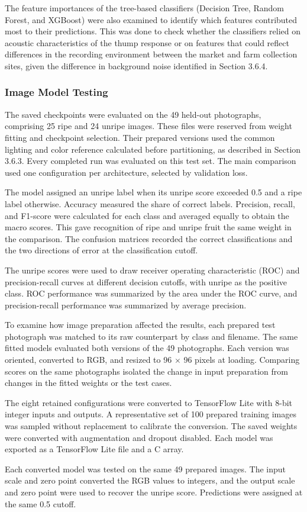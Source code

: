 \begin{thesisprose}
The feature importances of the tree-based classifiers (Decision Tree, Random Forest, and XGBoost) were also examined to identify which features contributed most to their predictions. This was done to check whether the classifiers relied on acoustic characteristics of the thump response or on features that could reflect differences in the recording environment between the market and farm collection sites, given the difference in background noise identified in Section 3.6.4.

\subsubsection*{Image Model Testing}

The saved checkpoints were evaluated on the 49 held-out photographs, comprising 25 ripe and 24 unripe images. These files were reserved from weight fitting and checkpoint selection. Their prepared versions used the common lighting and color reference calculated before partitioning, as described in Section 3.6.3. Every completed run was evaluated on this test set. The main comparison used one configuration per architecture, selected by validation loss.

The model assigned an unripe label when its unripe score exceeded 0.5 and a ripe label otherwise. Accuracy measured the share of correct labels. Precision, recall, and F1-score were calculated for each class and averaged equally to obtain the macro scores. This gave recognition of ripe and unripe fruit the same weight in the comparison. The confusion matrices recorded the correct classifications and the two directions of error at the classification cutoff.

The unripe scores were used to draw receiver operating characteristic (ROC) and precision-recall curves at different decision cutoffs, with unripe as the positive class. ROC performance was summarized by the area under the ROC curve, and precision-recall performance was summarized by average precision.

To examine how image preparation affected the results, each prepared test photograph was matched to its raw counterpart by class and filename. The same fitted models evaluated both versions of the 49 photographs. Each version was oriented, converted to RGB, and resized to 96 \ensuremath{\times} 96 pixels at loading. Comparing scores on the same photographs isolated the change in input preparation from changes in the fitted weights or the test cases.

The eight retained configurations were converted to TensorFlow Lite with 8-bit integer inputs and outputs. A representative set of 100 prepared training images was sampled without replacement to calibrate the conversion. The saved weights were converted with augmentation and dropout disabled. Each model was exported as a TensorFlow Lite file and a C array.

Each converted model was tested on the same 49 prepared images. The input scale and zero point converted the RGB values to integers, and the output scale and zero point were used to recover the unripe score. Predictions were assigned at the same 0.5 cutoff.

\end{thesisprose}
